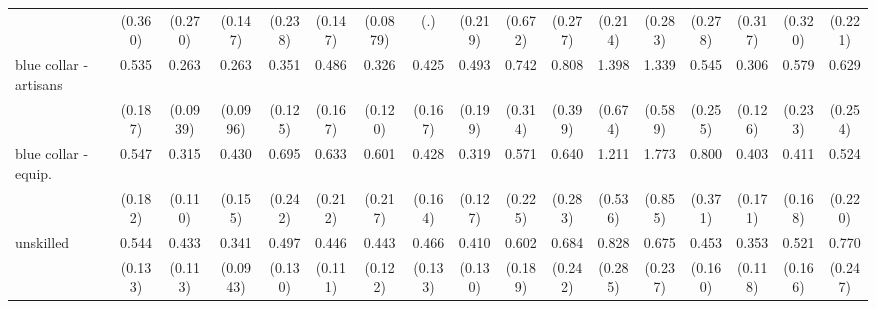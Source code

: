 {\begin{tabular}{l*{16}{c}}
                    &     (0.360)         &     (0.270)         &     (0.147)         &     (0.238)         &     (0.147)         &    (0.0879)         &         (.)         &     (0.219)         &     (0.672)         &     (0.277)         &     (0.214)         &     (0.283)         &     (0.278)         &     (0.317)         &     (0.320)         &     (0.221)         \\
[1em]
blue collar - artisans&       0.535         &       0.263\sym{***}&       0.263\sym{***}&       0.351\sym{**} &       0.486\sym{*}  &       0.326\sym{**} &       0.425\sym{*}  &       0.493         &       0.742         &       0.808         &       1.398         &       1.339         &       0.545         &       0.306\sym{**} &       0.579         &       0.629         \\
                    &     (0.187)         &    (0.0939)         &    (0.0996)         &     (0.125)         &     (0.167)         &     (0.120)         &     (0.167)         &     (0.199)         &     (0.314)         &     (0.399)         &     (0.674)         &     (0.589)         &     (0.255)         &     (0.126)         &     (0.233)         &     (0.254)         \\
[1em]
blue collar - equip.&       0.547         &       0.315\sym{***}&       0.430\sym{*}  &       0.695         &       0.633         &       0.601         &       0.428\sym{*}  &       0.319\sym{**} &       0.571         &       0.640         &       1.211         &       1.773         &       0.800         &       0.403\sym{*}  &       0.411\sym{*}  &       0.524         \\
                    &     (0.182)         &     (0.110)         &     (0.155)         &     (0.242)         &     (0.212)         &     (0.217)         &     (0.164)         &     (0.127)         &     (0.225)         &     (0.283)         &     (0.536)         &     (0.855)         &     (0.371)         &     (0.171)         &     (0.168)         &     (0.220)         \\
[1em]
unskilled           &       0.544\sym{*}  &       0.433\sym{**} &       0.341\sym{***}&       0.497\sym{**} &       0.446\sym{**} &       0.443\sym{**} &       0.466\sym{**} &       0.410\sym{**} &       0.602         &       0.684         &       0.828         &       0.675         &       0.453\sym{*}  &       0.353\sym{**} &       0.521\sym{*}  &       0.770         \\
                    &     (0.133)         &     (0.113)         &    (0.0943)         &     (0.130)         &     (0.111)         &     (0.122)         &     (0.133)         &     (0.130)         &     (0.189)         &     (0.242)         &     (0.285)         &     (0.237)         &     (0.160)         &     (0.118)         &     (0.166)         &     (0.247)         \\

\end{tabular}}
